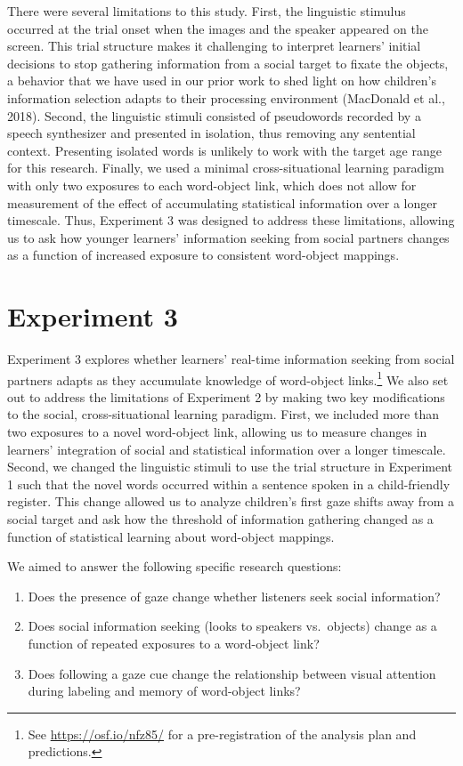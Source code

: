 \documentclass[man,floatsintext]{apa6}
\providecommand{\tightlist}{%
  \setlength{\itemsep}{0pt}\setlength{\parskip}{0pt}}
\let\rmarkdownfootnote\footnote%
\def\footnote{\protect\rmarkdownfootnote}
\begin{document}
There were several limitations to this study. First, the linguistic
stimulus occurred at the trial onset when the images and the speaker
appeared on the screen. This trial structure makes it challenging to
interpret learners' initial decisions to stop gathering information from
a social target to fixate the objects, a behavior that we have used in
our prior work to shed light on how children's information selection
adapts to their processing environment (MacDonald et al., 2018). Second,
the linguistic stimuli consisted of pseudowords recorded by a speech
synthesizer and presented in isolation, thus removing any sentential
context. Presenting isolated words is unlikely to work with the target
age range for this research. Finally, we used a minimal
cross-situational learning paradigm with only two exposures to each
word-object link, which does not allow for measurement of the effect of
accumulating statistical information over a longer timescale. Thus,
Experiment 3 was designed to address these limitations, allowing us to
ask how younger learners' information seeking from social partners
changes as a function of increased exposure to consistent word-object
mappings.

\section{Experiment 3}\label{experiment-3}

Experiment 3 explores whether learners' real-time information seeking
from social partners adapts as they accumulate knowledge of word-object
links.\footnote{See \url{https://osf.io/nfz85/} for a pre-registration
  of the analysis plan and predictions.} We also set out to address the
limitations of Experiment 2 by making two key modifications to the
social, cross-situational learning paradigm. First, we included more
than two exposures to a novel word-object link, allowing us to measure
changes in learners' integration of social and statistical information
over a longer timescale. Second, we changed the linguistic stimuli to
use the trial structure in Experiment 1 such that the novel words
occurred within a sentence spoken in a child-friendly register. This
change allowed us to analyze children's first gaze shifts away from a
social target and ask how the threshold of information gathering changed
as a function of statistical learning about word-object mappings.

We aimed to answer the following specific research questions:

\begin{enumerate}
\def\labelenumi{\arabic{enumi}.}
\tightlist
\item
  Does the presence of gaze change whether listeners seek social
  information?\\
\item
  Does social information seeking (looks to speakers vs.~objects) change
  as a function of repeated exposures to a word-object link?
\item
  Does following a gaze cue change the relationship between visual
  attention during labeling and memory of word-object links?
\end{enumerate}
\end{document}
